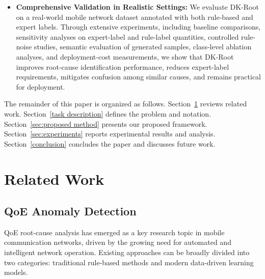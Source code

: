 \documentclass[lettersize,journal]{IEEEtran}
\begin{document}
\begin{itemize}
    \item \textbf{Comprehensive Validation in Realistic Settings:} We evaluate DK-Root on a real-world mobile network dataset annotated with both rule-based and expert labels. Through extensive experiments, including baseline comparisons, sensitivity analyses on expert-label and rule-label quantities, controlled rule-noise studies, semantic evaluation of generated samples, class-level ablation analyses, and deployment-cost measurements, we show that DK-Root improves root-cause identification performance, reduces expert-label requirements, mitigates confusion among similar causes, and remains practical for deployment.
\end{itemize}


The remainder of this paper is organized as follows. Section~\ref{sec:related_work} reviews related work. Section~\ref{task description} defines the problem and notation. Section~\ref{sec:proposed method} presents our proposed framework. Section~\ref{sec:experiments} reports experimental results and analysis. Section~\ref{conclusion} concludes the paper and discusses future work.



\section{Related Work}
\label{sec:related_work}


\subsection{QoE Anomaly Detection}

QoE root-cause analysis has emerged as a key research topic in mobile communication networks, driven by the growing need for automated and intelligent network operation. Existing approaches can be broadly divided into two categories: traditional rule-based methods and modern data-driven learning models.
\end{document}
